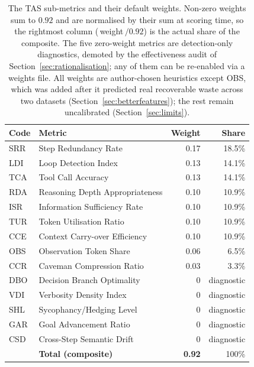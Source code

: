\documentclass[11pt]{article}
\begin{document}
\begin{table}[t]
\centering
\caption{The TAS sub-metrics and their default weights. Non-zero weights sum
to $0.92$ and are normalised by their sum at scoring time, so the rightmost
column (\,weight\,$/0.92$) is the actual share of the composite. The five
zero-weight metrics are detection-only diagnostics, demoted by the
effectiveness audit of Section~\ref{sec:rationalisation}; any of them can be
re-enabled via a weights file. All weights are author-chosen heuristics
except OBS, which was added after it predicted real recoverable waste across
two datasets (Section~\ref{sec:betterfeatures}); the rest remain uncalibrated
(Section~\ref{sec:limits}).}
\label{tab:metrics}
\begin{tabular}{llrr}
\toprule
Code & Metric & Weight & Share \\
\midrule
SRR & Step Redundancy Rate            & 0.17 & 18.5\% \\
LDI & Loop Detection Index            & 0.13 & 14.1\% \\
TCA & Tool Call Accuracy              & 0.13 & 14.1\% \\
RDA & Reasoning Depth Appropriateness & 0.10 & 10.9\% \\
ISR & Information Sufficiency Rate     & 0.10 & 10.9\% \\
TUR & Token Utilisation Ratio         & 0.10 & 10.9\% \\
CCE & Context Carry-over Efficiency   & 0.10 & 10.9\% \\
OBS & Observation Token Share         & 0.06 & \phantom{0}6.5\% \\
CCR & Caveman Compression Ratio       & 0.03 & \phantom{0}3.3\% \\
\midrule
DBO & Decision Branch Optimality      & 0 & diagnostic \\
VDI & Verbosity Density Index         & 0 & diagnostic \\
SHL & Sycophancy/Hedging Level        & 0 & diagnostic \\
GAR & Goal Advancement Ratio          & 0 & diagnostic \\
CSD & Cross-Step Semantic Drift       & 0 & diagnostic \\
\midrule
    & \textbf{Total (composite)}      & \textbf{0.92} & 100\% \\
\bottomrule
\end{tabular}
\end{table}
\end{document}
